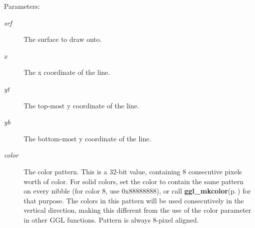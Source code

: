 \begin{Desc}
\item[Parameters:]
\begin{description}
\item[{\em srf}]The surface to draw onto. \item[{\em x}]The x coordinate of the line. \item[{\em yt}]The top-most y coordinate of the line. \item[{\em yb}]The bottom-most y coordinate of the line. \item[{\em color}]The color pattern. This is a 32-bit value, containing 8 consecutive pixels worth of color. For solid colors, set the color to contain the same pattern on every nibble (for color 8, use 0x88888888), or call {\bf ggl\_\-mkcolor}{\rm (p.\,\pageref{ggl_8h_a32})} for that purpose. The colors in this pattern will be used consecutively in the vertical direction, making this different from the use of the color parameter in other GGL functions. Pattern is always 8-pixel aligned. \end{description}
\end{Desc}
